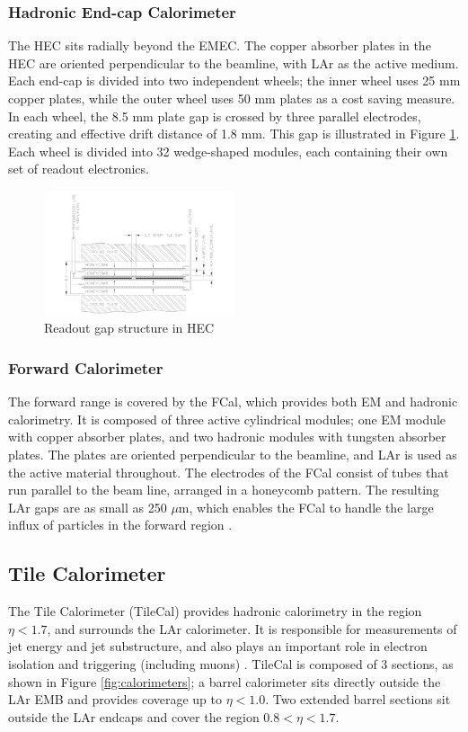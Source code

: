 \subsubsection{Hadronic End-cap Calorimeter}
The HEC sits radially beyond the EMEC. The copper absorber plates in the HEC are oriented perpendicular to the beamline, with LAr as the active medium. Each end-cap is divided into two independent wheels; the inner wheel uses 25 mm copper plates, while the outer wheel uses 50 mm plates as a cost saving measure. In each wheel, the 8.5 mm plate gap is crossed by three parallel electrodes, creating and effective drift distance of 1.8 mm. This gap is illustrated in Figure \ref{fig:hec}. Each wheel is divided into 32 wedge-shaped modules, each containing their own set of readout electronics.\par

\begin{figure}
        \centering
	\includegraphics[width=0.5\textwidth]{figures/ch3/hec.png}
	\caption{Readout gap structure in HEC \cite{lar_tdr}}
	\label{fig:hec}
\end{figure}

\subsubsection{Forward Calorimeter}
The forward range is covered by the FCal, which provides both EM and hadronic calorimetry. It is composed of three active cylindrical modules; one EM module with copper absorber plates, and two hadronic modules with tungsten absorber plates. The plates are oriented perpendicular to the beamline, and LAr is used as the active material throughout. The electrodes of the FCal consist of tubes that run parallel to the beam line, arranged in a honeycomb pattern. The resulting LAr gaps are as small as 250 $\mu$m, which enables the FCal to handle the large influx of particles in the forward region \cite{lar_tdr}. 

\subsection{Tile Calorimeter}
The Tile Calorimeter (TileCal) provides hadronic calorimetry in the region $\eta < 1.7$, and surrounds the LAr calorimeter. It is responsible for measurements of jet energy and jet substructure, and also plays an important role in electron isolation and triggering (including muons) \cite{tile_tdr}. TileCal is composed of 3 sections, as shown in Figure \ref{fig:calorimeters}; a barrel calorimeter sits directly outside the LAr EMB and provides coverage up to $\eta < 1.0$. Two extended barrel sections sit outside the LAr endcaps and cover the region $0.8 < \eta < 1.7$. \par

